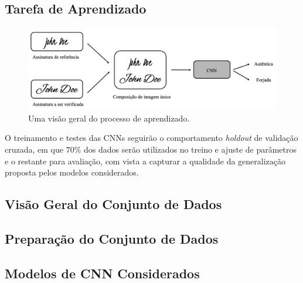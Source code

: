
\subsection{Tarefa de Aprendizado}

\begin{figure}[h!]
\centering
\caption{Uma visão geral do processo de aprendizado.}
\label{fig:esquema-solucao}
\includegraphics[width=\textwidth]{imgs/esquema-solucao}
\end{figure}

O treinamento e testes das CNNs seguirão o comportamento \emph{holdout} de validação
cruzada, em que $70\%$ dos dados serão utilizados no treino e ajuste de parâmetros e o
restante para avaliação, com vista a capturar a qualidade da generalização proposta pelos
modelos considerados.

\subsection{Visão Geral do Conjunto de Dados}


\subsection{Preparação do Conjunto de Dados}





\subsection{Modelos de CNN Considerados}
